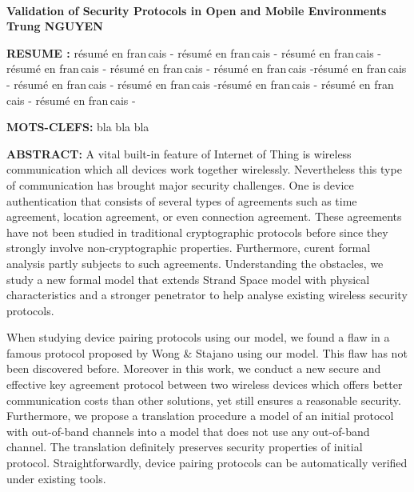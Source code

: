 \documentclass[11pt,a4paper]{book}
\newcommand\BackgroundPic{
\ifpdf
\else
\fi
}
\begin{document}
\AddToShipoutPicture*{\BackgroundPic}
~




%
\vspace{.5cm}
%

%
\vspace{1.0cm}
%
%
%
\begin{center}{\LARGE {\bf Validation of Security Protocols in Open and Mobile Environments}}\\
\vspace{.4cm}
{\large {\bf Trung NGUYEN}}\\
\end{center}

\vspace{.9cm}

{\bf RESUME : } r{\'e}sum{\'e} en fran{\,c}ais - r{\'e}sum{\'e} en fran{\,c}ais - r{\'e}sum{\'e} en fran{\,c}ais 
- r{\'e}sum{\'e} en fran{\,c}ais - r{\'e}sum{\'e} en fran{\,c}ais - r{\'e}sum{\'e} en fran{\,c}ais -r{\'e}sum{\'e} en fran{\,c}ais 
- r{\'e}sum{\'e} en fran{\,c}ais - r{\'e}sum{\'e} en fran{\,c}ais -r{\'e}sum{\'e} en fran{\,c}ais - r{\'e}sum{\'e} en fran{\,c}ais - r{\'e}sum{\'e} en fran{\,c}ais -

\vspace{.6cm}

{\bf MOTS-CLEFS:}  bla bla bla 

\vspace{1.0cm}

{\bf ABSTRACT: } 
A vital built-in feature of Internet of Thing is wireless communication which all devices work together wirelessly. Nevertheless this type of communication has brought major security challenges. One is device authentication that consists of several types of agreements such as time agreement, location agreement, or even connection agreement. These agreements have not been studied in traditional cryptographic protocols before since they strongly involve non-cryptographic properties. Furthermore, curent formal analysis partly subjects to such agreements. Understanding the obstacles, we study a new formal model that extends Strand Space model with physical characteristics and a stronger penetrator to help analyse existing wireless security protocols.

When studying device pairing protocols using our model, we found a flaw in a famous protocol proposed  by Wong \& Stajano using our model. This flaw has not been discovered before. Moreover in this work, we conduct a new secure and effective key agreement protocol between two wireless devices which offers better communication costs than other solutions, yet still ensures a reasonable security. Furthermore, we propose a translation procedure a model of an initial protocol with out-of-band channels into a model that does not use any out-of-band channel. The translation definitely preserves security properties of initial protocol. Straightforwardly, device pairing protocols can be automatically verified under existing tools. 
\end{document}
